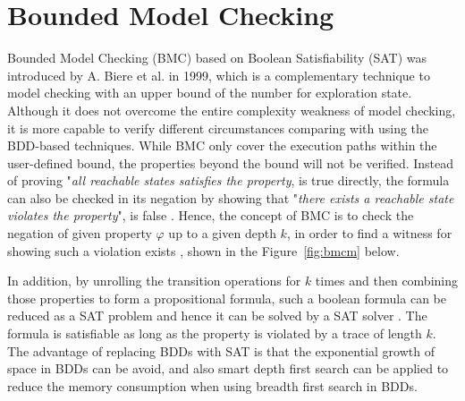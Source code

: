 \section{Bounded Model Checking} \label{sec:bmc}
Bounded Model Checking (BMC) based on Boolean Satisfiability (SAT) was introduced by A. Biere et al. in 1999\cite{biere2003bounded}, which is a complementary technique to model checking with an upper bound of the number for exploration state. Although it does not overcome the entire complexity weakness of model checking, it is more capable to verify different circumstances comparing with using the BDD-based techniques. While BMC only cover the execution paths within the user-defined bound, the properties beyond the bound will not be verified. Instead of proving "\textit{all reachable states satisfies the property}, is true directly, the formula can also be checked in its negation by showing that "\textit{there exists a reachable state violates the property}", is false \cite{Clarke:2001:BMC:510986.510987}. Hence, the concept of BMC is to check the negation of given property $\varphi$ up to a given depth $k$, in order to find a witness for showing such a violation exists \cite{7423219}, shown in the Figure~\ref{fig:bmcm} below. 




In addition, by unrolling the transition operations for $k$ times and then combining those properties to form a propositional formula, such a boolean formula can be reduced as a SAT problem and hence it can be solved by a SAT solver \cite{biere2003bounded, 1_sagiv_2015}. The formula is satisfiable as long as the property is violated by a trace of length $k$. The advantage of replacing BDDs with SAT is that the exponential growth of space in BDDs can be avoid, and also smart depth first search can be applied to reduce the memory consumption when using breadth first search in BDDs. 

